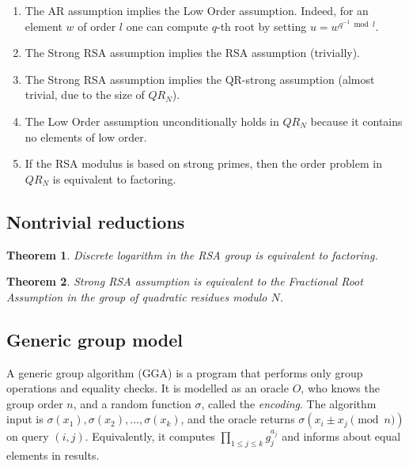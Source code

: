 \documentclass[a4paper]{article}
\newtheorem{theorem}{Theorem}
\begin{document}
\begin{enumerate}
    \item The AR  assumption implies the Low Order assumption. Indeed, for an element $w$ of order $l$ one can compute $q$-th root by setting $u = w^{q^{-1}\bmod{l}}$. 
    \item The Strong RSA assumption implies the RSA assumption (trivially).
    \item The Strong RSA assumption implies the QR-strong  assumption (almost trivial, due to the size of $QR_N$).
    \item The Low Order assumption unconditionally holds in $QR_N$ because it contains no elements of low order.
    \item If the RSA modulus is based on strong primes, then the order problem in $QR_N$ is equivalent to factoring.
\end{enumerate}

\subsection{Nontrivial reductions}
\begin{theorem}\cite{bach1984discrete}
Discrete logarithm in the RSA group is equivalent to factoring.
\end{theorem}

\begin{theorem}\cite[Th. 1]{DBLP:conf/ccs/CramerS99}
Strong RSA assumption is equivalent to the Fractional Root Assumption in the group of quadratic residues modulo $N$.
\end{theorem}

\subsection{Generic group model}

A generic group algorithm (GGA) is a program that performs only group operations and equality checks. It is modelled as an oracle $O$, who knows the group order $n$, and a random function $\sigma$, called the \emph{encoding}. The algorithm input is $\sigma(x_1),\sigma(x_2),\ldots,\sigma(x_k)$, and the oracle returns $\sigma(x_i\pm x_j\pmod{n})$ on query $(i,j)$. Equivalently, it computes $\prod_{1\leq j \leq k}g_j^{a_j}$ and informs about equal elements in results.
\end{document}
